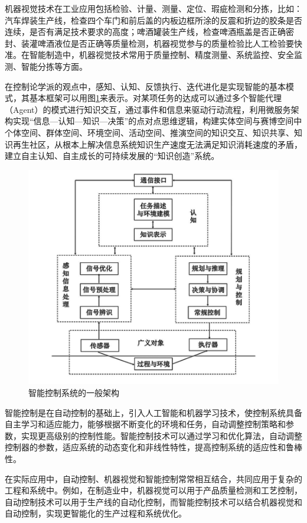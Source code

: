 \documentclass[lang=cn,12pt,bibtex,newtx,twoside,margintrue,citestyle=gb7714-2015, bibstyle=gb7714-2015]{elegantbook}
\begin{document}
机器视觉技术在工业应用包括检验、计量、测量、定位、瑕疵检测和分拣，比如：汽车焊装生产线，检查四个车门和前后盖的内板边框所涂的反震和折边的胶条是否连续，是否有满足技术要求的高度；啤酒罐装生产线，检查啤酒瓶盖是否正确密封、装灌啤酒液位是否正确等质量检测，机器视觉参与的质量检验比人工检验要快准。在智能制造中，机器视觉技术常用于质量控制、精度测量、系统监控、安全监测、智能分拣等方面。

在控制论学派的观点中，感知、认知、反馈执行、迭代进化是实现智能的基本模式，其基本框架可以用图\ref{2.4}来表示。对某项任务的达成可以通过多个智能代理（Agent）的模式进行知识交互，通过事件和信息来驱动行动流程，利用微服务架构实现“信息—认知—知识—决策”的点对点思维逻辑，构建实体空间与赛博空间中个体空间、群体空间、环境空间、活动空间、推演空间的知识交互、知识共享、知识再生社区，从根本上解决信息系统知识生产速度无法满足知识消耗速度的矛盾，建立自主认知、自主成长的可持续发展的“知识创造”系统。

\begin{figure}[htbp]
\centering
\includegraphics[angle=0,width=12cm]{./figure/2.4.png}
\caption{\label{2.4}智能控制系统的一般架构}
\end{figure}


智能控制是在自动控制的基础上，引入人工智能和机器学习技术，使控制系统具备自主学习和适应能力，能够根据不断变化的环境和任务，自动调整控制策略和参数，实现更高级别的控制性能。智能控制技术可以通过学习和优化算法，自动调整控制器的参数，适应系统的动态变化和非线性特性，提高控制系统的适应性和鲁棒性。

在实际应用中，自动控制、机器视觉和智能控制常常相互结合，共同应用于复杂的工程和系统中。例如，在制造业中，机器视觉可以用于产品质量检测和工艺控制，自动控制技术可以用于生产线的自动化控制，而智能控制技术可以结合机器视觉和自动控制，实现更智能化的生产过程和系统优化。
\end{document}
